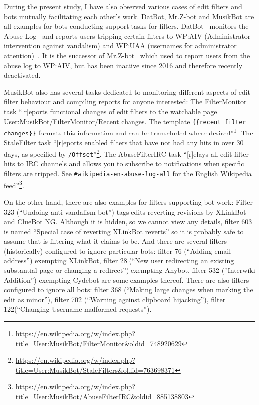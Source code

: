 During the present study, I have also observed various cases of edit filters and bots mutually facilitating each other's work.
DatBot, Mr.Z-bot and MusikBot are all examples for bots conducting support tasks for filters.
DatBot~\cite{Wikipedia:DatBot} monitors the Abuse Log~\cite{Wikipedia:AbuseLog}
and reports users tripping certain filters to WP:AIV (Administrator intervention against vandalism)\cite{Wikipedia:AIV} and WP:UAA (usernames for administrator attention)~\cite{Wikipedia:UAA}.
It is the successor of Mr.Z-bot~\cite{Wikipedia:MrZBot}
which used to report users from the abuse log to WP:AIV, but has been inactive since 2016 and therefore recently deactivated.

MusikBot also has several tasks dedicated to monitoring different aspects of edit filter behaviour and compiling reports for anyone interested:
The FilterMonitor task ``[r]eports functional changes of edit filters to the watchable page User:MusikBot/FilterMonitor/Recent changes. The template \verb|{{recent filter changes}}| formats this information and can be transcluded where desired''\footnote{\url{https://en.wikipedia.org/w/index.php?title=User:MusikBot/FilterMonitor&oldid=748920629}}.
The StaleFilter task ``[r]eports enabled filters that have not had any hits in over 30 days, as specified by \verb|/Offset|''\footnote{\url{https://en.wikipedia.org/w/index.php?title=User:MusikBot/StaleFilters&oldid=763698371}}.
The AbuseFilterIRC task ``[r]elays all edit filter hits to IRC channels and allows you to subscribe to notifications when specific filters are tripped. See \verb|#wikipedia-en-abuse-log-all| for the English Wikipedia feed''\footnote{\url{https://en.wikipedia.org/w/index.php?title=User:MusikBot/AbuseFilterIRC&oldid=885138803}}.

On the other hand, there are also examples for filters supporting bot work:
Filter 323 (``Undoing anti-vandalism bot'') tags edits reverting revisions by XLinkBot and ClueBot NG.
Although it is hidden, so we cannot view any details, filter 603 is named ``Special case of reverting XLinkBot reverts'' so it is probably safe to assume that is filtering what it claims to be.
And there are several filters (historically) configured to ignore particular bots: filter 76 (``Adding email address'') exempting XLinkBot, filter 28 (``New user redirecting an existing substantial page or changing a redirect'') exempting Anybot, filter 532 (``Interwiki Addition'') exempting Cydebot are some examples thereof.
There are also filters configured to ignore all bots: filter 368 (``Making large changes when marking the edit as minor''), filter 702 (``Warning against clipboard hijacking''), filter 122(``Changing Username malformed requests'').

